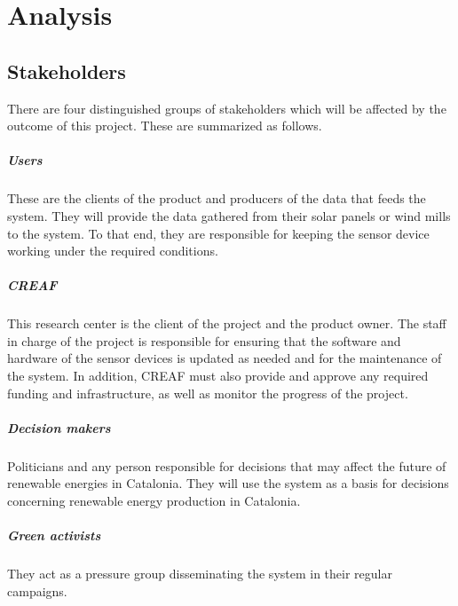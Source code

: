 \chapter{Analysis}

\section{Stakeholders}

There are four distinguished groups of stakeholders which will be affected by the outcome of this project. These are summarized as follows.

\paragraph{Users} These are the clients of the product and producers of the data that feeds the system. They will provide the data gathered from their solar panels or wind mills to the system. To that end, they are responsible for keeping the sensor device working under the required conditions.
\paragraph{CREAF} This research center is the client of the project and the product owner. The staff in charge of the project is responsible for ensuring that the software and hardware of the sensor devices is updated as needed and for the maintenance of the system. In addition, CREAF must also provide and approve any required funding and infrastructure, as well as monitor the progress of the project.
\paragraph{Decision makers} Politicians and any person responsible for decisions that may affect the future of renewable energies in Catalonia. They will use the system as a basis for decisions concerning renewable energy production in Catalonia.
\paragraph{Green activists} They act as a pressure group disseminating the system in their regular campaigns.

